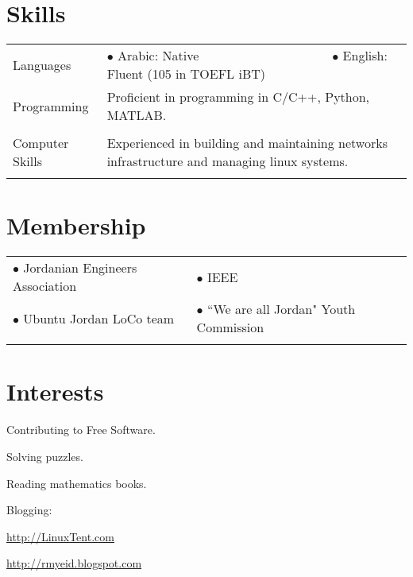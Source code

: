 \documentclass[a4paper, oneside, final]{scrartcl}
\newcommand{\twidthb}{12.65cm}
\newcommand{\twidtha}{3.0cm}
\begin{document}
\section{Skills}

\begin{tabular}{p{\twidtha} p{\twidthb}}
Languages & 

$\bullet$ Arabic: Native \,\,\,\,\,\,\,\,\,\,\,\,\,\,\,\,\,\,\,\,\,\,\,\,\,\,\,\,\,\,\,\,\,\,\,\,\,\,\,\,\,\,\,\,\,\,\,\,\,\,\,\,\,\,\,\,\,\,\,
$\bullet$ English: Fluent \footnotesize{(105 in TOEFL iBT)}


\\
Programming & Proficient in programming in C/C++, Python, MATLAB.
\\
\\
Computer Skills & Experienced in building and maintaining networks infrastructure and managing linux systems.
\\ &


\end{tabular}

\section{Membership}
\begin{tabular}{p{}p{}}
    $\bullet$ Jordanian Engineers Association &
    $\bullet$ IEEE \\ \vspace{0.05pt}
    $\bullet$ Ubuntu Jordan LoCo team & \vspace{0.05pt}
    $\bullet$ ``We are all Jordan" Youth Commission \\ &
\end{tabular}

\section{Interests}
\vspace{-14pt}
\begin{multicols}{2}
        \begin{compactitem}
\item Contributing to Free Software.
\item Solving puzzles.
\item Reading mathematics books.
\item Blogging:
       \begin{compactitem}
    \item \url{http://LinuxTent.com}
    \item \url{http://rmyeid.blogspot.com}
            \end{compactitem} 
            \end{compactitem} 
\end{multicols}


      
\end{document}

